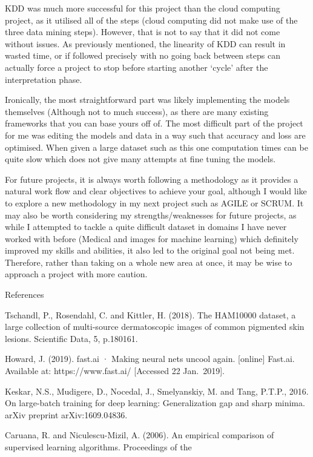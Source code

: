 \documentclass[11pt]{article}
\begin{document}
KDD was much more successful for this project than the cloud computing
project, as it utilised all of the steps (cloud computing did not make
use of the three data mining steps). However, that is not to say that it
did not come without issues. As previously mentioned, the linearity of
KDD can result in wasted time, or if followed precisely with no going
back between steps can actually force a project to stop before starting
another `cycle' after the interpretation phase.

Ironically, the most straightforward part was likely implementing the
models themselves (Although not to much success), as there are many
existing frameworks that you can base yours off of. The most difficult
part of the project for me was editing the models and data in a way such
that accuracy and loss are optimised. When given a large dataset such as
this one computation times can be quite slow which does not give many
attempts at fine tuning the models.

For future projects, it is always worth following a methodology as it
provides a natural work flow and clear objectives to achieve your goal,
although I would like to explore a new methodology in my next project
such as AGILE or SCRUM. It may also be worth considering my
strengths/weaknesses for future projects, as while I attempted to tackle
a quite difficult dataset in domains I have never worked with before
(Medical and images for machine learning) which definitely improved my
skills and abilities, it also led to the original goal not being met.
Therefore, rather than taking on a whole new area at once, it may be
wise to approach a project with more caution.

    References

Tschandl, P., Rosendahl, C. and Kittler, H. (2018). The HAM10000
dataset, a large collection of multi-source dermatoscopic images of
common pigmented skin lesions. Scientific Data, 5, p.180161.

Howard, J. (2019). fast.ai · Making neural nets uncool again.
{[}online{]} Fast.ai. Available at: https://www.fast.ai/ {[}Accessed 22
Jan.~2019{]}.

Keskar, N.S., Mudigere, D., Nocedal, J., Smelyanskiy, M. and Tang,
P.T.P., 2016. On large-batch training for deep learning: Generalization
gap and sharp minima. arXiv preprint arXiv:1609.04836.

Caruana, R. and Niculescu-Mizil, A. (2006). An empirical comparison of
supervised learning algorithms. Proceedings of the
\end{document}
